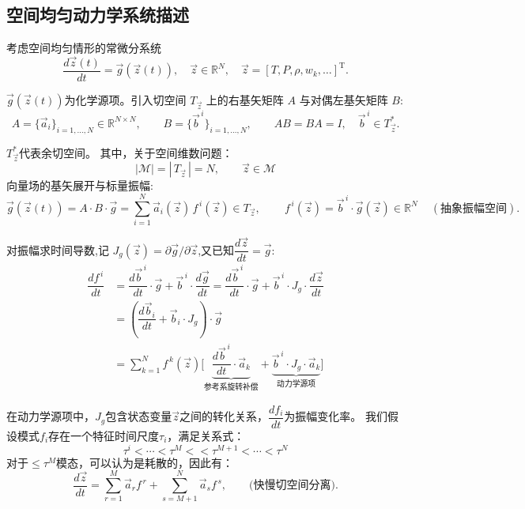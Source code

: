 \documentclass[11pt,a4paper]{article}
\newcommand{\R}{\mathbb{R}}
\newcommand{\Jg}{J_{\!g}}
\newcommand{\diff}[2]{\dfrac{d #1}{d #2}}
\begin{document}
\subsection{空间均匀动力学系统描述}

考虑空间均匀情形的常微分系统
\begin{equation}
	\diff{\vec z(t)}{t}=\vec g(\vec z(t)),\quad
	\vec z\in\R^N,\quad \vec z=[T,P,\rho,w_k,\dots]^{\mathrm T}.
\end{equation}

$\vec g(\vec z(t))$为化学源项。引入切空间 $T_{\vec z}$ 上的右基矢矩阵 $A$ 与对偶左基矢矩阵 $B$:
\begin{equation}
A=\{\vec a_i\}_{i=1,\dots,N}\in\R^{N\times N},\qquad
B=\{\vec b^{\,i}\}_{i=1,\dots,N},\qquad
AB=BA=I,\quad \vec b^{\,i}\in T^*_{\vec z}.
\end{equation}

$T^*_{\vec z}$代表余切空间。
其中，关于空间维数问题：
\begin{equation}
	|\mathcal{M}|=|\,T_{\vec z}\,|=N, \qquad
	\vec z\in \mathcal{M}
\end{equation}
向量场的基矢展开与标量振幅:
\begin{equation}
\vec g(\vec z(t))=A\cdot B\cdot \vec g=\sum_{i=1}^{N}\vec a_i(\vec z)\,f^{\,i}(\vec z) \in T_{\vec z},\qquad
\boxed{\,f^{\,i}(\vec z)=\vec b^{\,i}\cdot\vec g(\vec z)\in\R^N\,} \quad(\text{抽象振幅空间}).
\end{equation}

对振幅求时间导数,记 $\Jg(\vec z)=\partial\vec g/\partial\vec z$,又已知$\diff{\vec z}{t}=\vec g$:
\begin{align}
\diff{f^{\,i}}{t}
&=\diff{\vec b^{\,i}}{t}\cdot\vec g+\vec b^{\,i}\cdot\diff{\vec g}{t}
 =\diff{\vec b^{\,i}}{t}\cdot\vec g+\vec b^{\,i}\cdot\Jg\cdot\diff{\vec z}{t} \nonumber\\
&=(\diff{\vec b_i}{t} + \vec b_i \cdot \Jg)\cdot \vec g \nonumber\\
&=\sum_{k=1}^{N}f^{\,k}(\vec z)\Big[\underbrace{\diff{\vec b^{\,i}}{t}\cdot\vec a_k}_{\text{参考系旋转补偿}}
   +\underbrace{\vec b^{\,i}\cdot\Jg\cdot\vec a_k}_{\text{动力学源项}}\Big]
   \label{模式微分}
\end{align}

在动力学源项中，$\Jg$包含状态变量$\vec z$之间的转化关系，$\diff{f_i}{t}$为振幅变化率。
我们假设模式$f_i$存在一个特征时间尺度$\tau_i$，满足关系式：
\[\tau^i<\cdots<\tau^M<<\tau^{M+1}<\cdots<\tau^N
\]
对于$\le \tau^M$模态，可以认为是耗散的，因此有：
\begin{equation}
	\diff{\vec z}{t}=\sum_{r=1}^{M}\vec a_r f^{\,r}+\sum_{s=M+1}^{N}\vec a_s f^{\,s},
	\qquad\text{(快慢切空间分离)}.
\end{equation}
\end{document}
